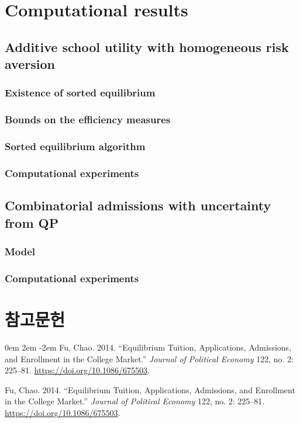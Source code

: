 \documentclass[12pt]{article} %
\newif\ifEN
\theoremstyle{definition}
\theoremstyle{definition}
\begin{document}
\section{Computational results}

\subsection{Additive school utility with homogeneous risk aversion}
\subsubsection{Existence of sorted equilibrium}
\subsubsection{Bounds on the efficiency measures}
\subsubsection{Sorted equilibrium algorithm}
\subsubsection{Computational experiments}

\subsection{Combinatorial admissions with uncertainty from QP}
\subsubsection{Model}
\subsubsection{Computational experiments}


\ifEN \section{References} \else \section{참고문헌} \fi
\noindent

\parskip 0em
\leftskip 2em
\parindent -2em
Fu, Chao. 2014. ``Equilibrium Tuition, Applications, Admissions, and Enrollment in the College Market.'' \emph{Journal of Political Economy} 122, no. 2: 225--81. \url{https://doi.org/10.1086/675503}. 

Fu, Chao. 2014. ``Equilibrium Tuition, Applications, Admissions, and Enrollment in the College Market.'' \emph{Journal of Political Economy} 122, no. 2: 225--81. \url{https://doi.org/10.1086/675503}. 
\end{document}
